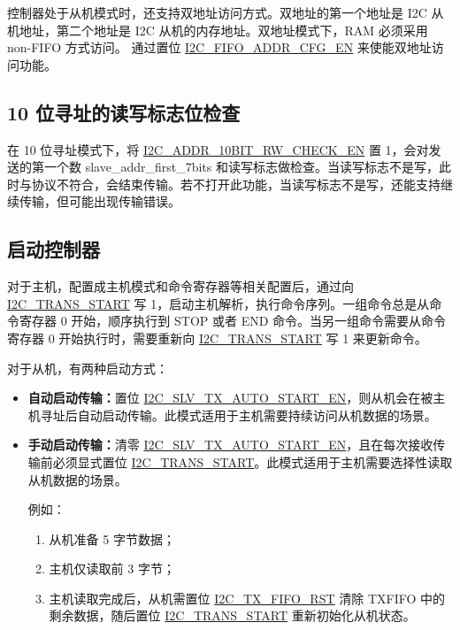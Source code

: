 \documentclass[main\_\_CN.tex]{subfiles}
\begin{document}
控制器处于从机模式时，还支持双地址访问方式。双地址的第一个地址是 I2C 从机地址，第二个地址是 I2C 从机的内存地址。双地址模式下，RAM 必须采用 non-FIFO 方式访问。
通过置位 \hyperref[fielddesc:I2CFIFOADDRCFGEN]{I2C\_FIFO\_ADDR\_CFG\_EN} 来使能双地址访问功能。
 
\subsection{10 位寻址的读写标志位检查}
在 10 位寻址模式下，将 \hyperref[fielddesc:I2CADDR10BITRWCHECKEN]{I2C\_ADDR\_10BIT\_RW\_CHECK\_EN} 置 1，会对发送的第一个数 slave\_addr\_first\_7bits 和读写标志做检查。当读写标志不是写，此时与协议不符合，会结束传输。若不打开此功能，当读写标志不是写，还能支持继续传输，但可能出现传输错误。

\subsection{启动控制器}\label{subsubsec:i2c-start}
对于主机，配置成主机模式和命令寄存器等相关配置后，通过向 \hyperref[fielddesc:I2CTRANSSTART]{I2C\_TRANS\_START} 写 1，启动主机解析，执行命令序列。一组命令总是从命令寄存器 0 开始，顺序执行到 STOP 或者 END 命令。当另一组命令需要从命令寄存器 0 开始执行时，需要重新向 \hyperref[fielddesc:I2CTRANSSTART]{I2C\_TRANS\_START} 写 1 来更新命令。

对于从机，有两种启动方式：
\begin{itemize}
    \item \textbf{自动启动传输：}置位 \hyperref[fielddesc:I2CSLVTXAUTOSTARTEN]{I2C\_SLV\_TX\_AUTO\_START\_EN}，则从机会在被主机寻址后自动启动传输。此模式适用于主机需要持续访问从机数据的场景。
    \item \textbf{手动启动传输：}清零 \hyperref[fielddesc:I2CSLVTXAUTOSTARTEN]{I2C\_SLV\_TX\_AUTO\_START\_EN}，且在每次接收传输前必须显式置位 \hyperref[fielddesc:I2CTRANSSTART]{I2C\_TRANS\_START}。此模式适用于主机需要选择性读取从机数据的场景。

例如：
\begin{enumerate}
\item 从机准备 5 字节数据；
\item 主机仅读取前 3 字节；
\item 主机读取完成后，从机需置位 \hyperref[fielddesc:I2CTXFIFORST]{I2C\_TX\_FIFO\_RST} 清除 TXFIFO 中的剩余数据，随后置位 \hyperref[fielddesc:I2CTRANSSTART]{I2C\_TRANS\_START} 重新初始化从机状态。
\end{enumerate}

\end{itemize}
\end{document}
